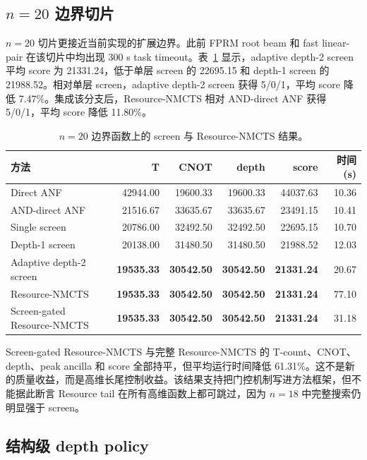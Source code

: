 \documentclass[UTF8,fontset=macnew,11pt]{ctexart}
\newcommand{\method}{Resource-NMCTS}
\begin{document}
\subsection{\texorpdfstring{$n=20$}{n=20} 边界切片}

$n=20$ 切片更接近当前实现的扩展边界。此前 FPRM root beam 和 fast linear-pair 在该切片中均出现 300 s task timeout。表~\ref{tab:n20} 显示，adaptive depth-2 screen 平均 score 为 21331.24，低于单层 screen 的 22695.15 和 depth-1 screen 的 21988.52。相对单层 screen，adaptive depth-2 screen 获得 5/0/1，平均 score 降低 7.47\%。集成该分支后，\method{} 相对 AND-direct ANF 获得 5/0/1，平均 score 降低 11.80\%。

\begin{table}[t]
\centering
\scriptsize
\caption{$n=20$ 边界函数上的 screen 与 \method{} 结果。}
\label{tab:n20}
\begin{tabularx}{\linewidth}{>{\raggedright\arraybackslash}Xrrrrr}
\toprule
方法 & T & CNOT & depth & score & 时间(s) \\
\midrule
Direct ANF & 42944.00 & 19600.33 & 19600.33 & 44037.63 & 10.36 \\
AND-direct ANF & 21516.67 & 33635.67 & 33635.67 & 23491.15 & 10.41 \\
Single screen & 20786.00 & 32492.50 & 32492.50 & 22695.15 & 10.70 \\
Depth-1 screen & 20138.00 & 31480.50 & 31480.50 & 21988.52 & 12.03 \\
Adaptive depth-2 screen & \textbf{19535.33} & \textbf{30542.50} & \textbf{30542.50} & \textbf{21331.24} & 20.67 \\
\method{} & \textbf{19535.33} & \textbf{30542.50} & \textbf{30542.50} & \textbf{21331.24} & 77.10 \\
Screen-gated \method{} & \textbf{19535.33} & \textbf{30542.50} & \textbf{30542.50} & \textbf{21331.24} & 31.18 \\
\bottomrule
\end{tabularx}
\end{table}

Screen-gated \method{} 与完整 \method{} 的 T-count、CNOT、depth、peak ancilla 和 score 全部持平，但平均运行时间降低 61.31\%。这不是新的质量收益，而是高维长尾控制收益。该结果支持把门控机制写进方法框架，但不能据此断言 Resource tail 在所有高维函数上都可跳过，因为 $n=18$ 中完整搜索仍明显强于 screen。

\subsection{结构级 depth policy}
\end{document}
